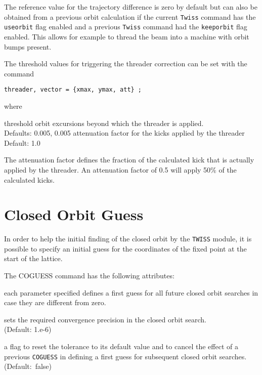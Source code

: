 The reference value for the trajectory difference is zero by default but
can also be obtained from a previous orbit calculation if the current
{\tt Twiss} command has the {\tt useorbit} flag enabled and a previous
{\tt Twiss} command had the {\tt keeporbit} flag enabled. This allows
for example to thread the beam into a machine with orbit bumps present.  

The threshold values for triggering the threader correction can be set
with the command  
\begin{verbatim}
threader, vector = {xmax, ymax, att} ;
\end{verbatim}  
where 
\begin{madlist}
 threshold orbit excursions beyond which the threader
is applied. \\ Defaults: 0.005, 0.005
 attenuation factor for the kicks applied by the threader
\\ Default: 1.0 
\end{madlist}

The attenuation factor defines the fraction of the calculated kick that
is actually applied by the threader.  
An attenuation factor of 0.5 will apply 50\% of the calculated kicks.

\section{Closed Orbit Guess}
\label{subsec:coguess}

In order to help the initial finding of the closed orbit by the
\texttt{TWISS} module, it is possible to specify an initial guess for
the coordinates of the fixed point at the start of the lattice.


The COGUESS command has the following attributes:
\begin{madlist}
   each parameter specified defines a first guess for all future closed orbit
  searches in case they are different from zero.  
  
   sets the required convergence precision in the closed
  orbit search. \\ (Default: 1.e-6)  
  
   a flag to reset the tolerance to its default value and to
  cancel the effect of a previous \texttt{COGUESS} in defining a first
  guess for subsequent closed orbit searches. \\ (Default:~false) 

\end{madlist}


